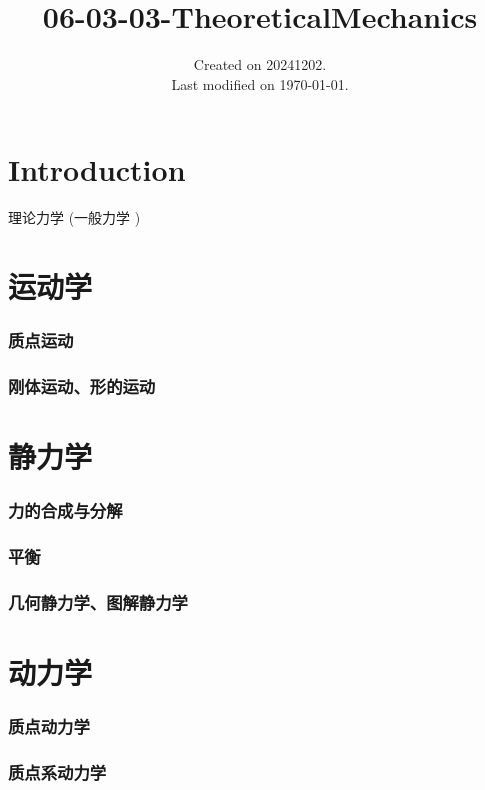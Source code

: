\documentclass[UTF8]{../../06-Physics}
\begin{document}
\title{06-03-03-TheoreticalMechanics}
\date{Created on 20241202.\\   Last modified on \today.}
\maketitle
\tableofcontents


\chapter{Introduction}

理论力学 (一般力学 )



\chapter{运动学}
    \subsection{质点运动}
    \subsection{刚体运动、形的运动}

\chapter{静力学}
    \subsection{力的合成与分解}
    \subsection{平衡}
    \subsection{几何静力学、图解静力学}

\chapter{动力学}
    \subsection{质点动力学}
    \subsection{质点系动力学}
\end{document}
